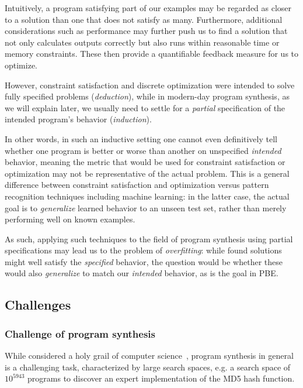\documentclass{article}
\begin{document}
Intuitively, a program satisfying part of our examples may be regarded as closer to a solution than one that does not satisfy as many.
Furthermore, additional considerations such as performance may further push us to find a solution that not only calculates outputs correctly but also runs within reasonable time or memory constraints.
These then provide a quantifiable feedback measure for us to optimize.

However, constraint satisfaction and discrete optimization were intended to solve fully specified problems (\emph{deduction}),
while in modern-day program synthesis, as we will explain later,
we usually need to settle for a \emph{partial} specification of the intended program's behavior (\emph{induction}).

In other words, in such an inductive setting one cannot even definitively tell whether one program is better or worse than another on unspecified \emph{intended} behavior,
meaning the metric that would be used for constraint satisfaction or optimization may not be representative of the actual problem.
This is a general difference between constraint satisfaction and optimization versus pattern recognition techniques including machine learning:
in the latter case, the actual goal is to \emph{generalize} learned behavior to an unseen test set,
rather than merely performing well on known examples.

As such, applying such techniques to the field of program synthesis using partial specifications may lead us to the problem of \emph{overfitting}:
while found solutions might well satisfy the \emph{specified} behavior,
the question would be whether these would also \emph{generalize} to match our \emph{intended} behavior,
as is the goal in PBE.

\subsection{Challenges}

\subsubsection{Challenge of program synthesis}

While considered a holy grail of computer science~\citep{gulwani2017program},
program synthesis in general is a challenging task, characterized by large search spaces,
e.g. a search space of $10^{5943}$ programs to discover an expert implementation of the MD5 hash function.~\cite{gulwani2017program}
\end{document}
